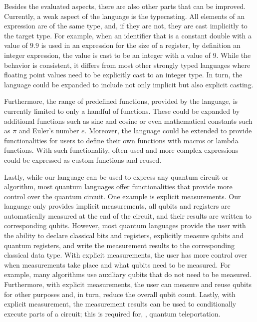 Besides the evaluated aspects, there are also other parts that can be improved. Currently, a weak aspect of the language is the typecasting. All elements of an expression are of the same type, and, if they are not, they are cast implicitly to the target type. For example, when an identifier that is a constant double with a value of $9.9$ is used in an expression for the size of a register, by definition an integer expression, the value is cast to be an integer with a value of $9$. While the behavior is consistent, it differs from most other strongly typed languages where floating point values need to be explicitly cast to an integer type. In turn, the language could be expanded to include not only implicit but also explicit casting.

Furthermore, the range of predefined functions, provided by the language, is currently limited to only a handful of functions. These could be expanded by additional functions such as sine and cosine or even mathematical constants such as $\pi$ and Euler's number $e$. Moreover, the language could be extended to provide functionalities for users to define their own functions with macros or lambda functions. With such functionality, often-used and more complex expressions could be expressed as custom functions and reused.

Lastly, while our language can be used to express any quantum circuit or algorithm, most quantum languages offer functionalities that provide more control over the quantum circuit. One example is explicit measurements. Our language only provides implicit measurements, \ie all qubits and registers are automatically measured at the end of the circuit, and their results are written to corresponding qubits. However, most quantum languages provide the user with the ability to declare classical bits and registers, explicitly measure qubits and quantum registers, and write the measurement results to the corresponding classical data type. With explicit measurements, the user has more control over when measurements take place and what qubits need to be measured. For example, many algorithms use auxiliary qubits that do not need to be measured. Furthermore, with explicit measurements, the user can measure and reuse qubits for other purposes and, in turn, reduce the overall qubit count. Lastly, with explicit measurement, the measurement results can be used to conditionally execute parts of a circuit; this is required for, \eg, quantum teleportation.